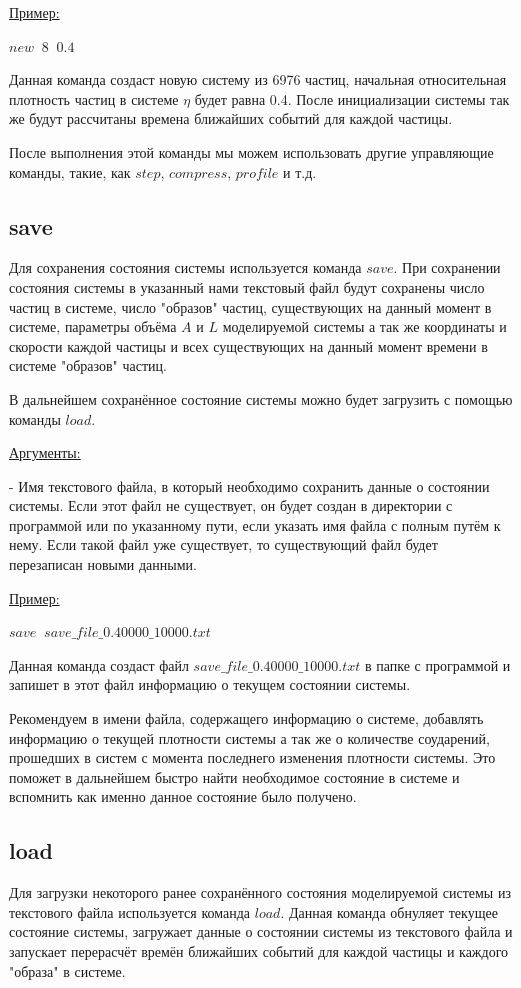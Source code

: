 \documentclass[a4paper]{article}
\begin{document}
\uline{Пример:}

$ new \;\; 8 \;\; 0.4 $

Данная команда создаст новую систему из 6976 частиц, начальная относительная плотность частиц в системе $ \eta $ будет равна 0.4. После инициализации системы так же будут рассчитаны времена ближайших событий для каждой частицы.

После выполнения этой команды мы можем использовать другие управляющие команды, такие, как $ step $, $ compress $, $ profile $ и т.д.


\subsection{save}
Для сохранения состояния системы используется команда $ save $. При сохранении состояния системы в указанный нами текстовый файл будут сохранены число частиц в системе, число "образов" частиц, существующих на данный момент в системе, параметры объёма $ A $ и $ L $ моделируемой системы а так же координаты и скорости каждой частицы и всех существующих на данный момент времени в системе "образов" частиц.

В дальнейшем сохранённое состояние системы можно будет загрузить с помощью команды $ load $.

\uline{Аргументы:}

- Имя текстового файла, в который необходимо сохранить данные о состоянии системы. Если этот файл не существует, он будет создан в директории с программой или по указанному пути, если указать имя файла с полным путём к нему. Если такой файл уже существует, то существующий файл будет перезаписан новыми данными.

\uline{Пример:}

$ save \;\; save\_file\_0.40000\_10000.txt $

Данная команда создаст файл $ save\_file\_0.40000\_10000.txt $ в папке с программой и запишет в этот файл информацию о текущем состоянии системы.

Рекомендуем в имени файла, содержащего информацию о системе, добавлять информацию о текущей плотности системы а так же о количестве соударений, прошедших в систем с момента последнего изменения плотности системы. Это поможет в дальнейшем быстро найти необходимое состояние в системе и вспомнить как именно данное состояние было получено.

\subsection{load}
Для загрузки некоторого ранее сохранённого состояния моделируемой системы из текстового файла используется команда $ load $. Данная команда обнуляет текущее состояние системы, загружает данные о состоянии системы из текстового файла и запускает перерасчёт времён ближайших событий для каждой частицы и каждого "образа" в системе.
\end{document}
